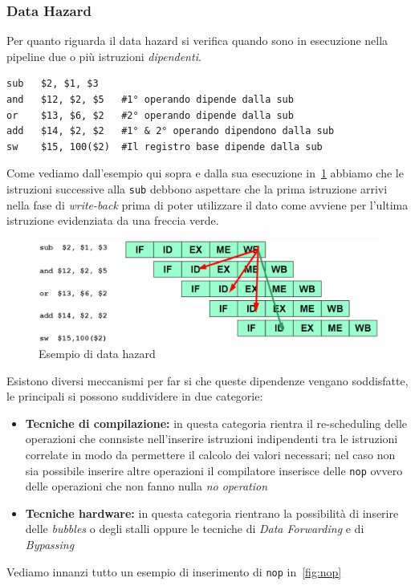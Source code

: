 \subsubsection{Data Hazard}
Per quanto riguarda il data hazard si verifica quando sono in esecuzione nella pipeline due o più istruzioni \emph{dipendenti}.
\begin{verbatim}
sub   $2, $1, $3
and   $12, $2, $5   #1° operando dipende dalla sub
or    $13, $6, $2   #2° operando dipende dalla sub
add   $14, $2, $2   #1° & 2° operando dipendono dalla sub
sw    $15, 100($2)  #Il registro base dipende dalla sub
\end{verbatim}
Come vediamo dall'esempio qui sopra e dalla sua esecuzione in \figurename\,\ref{fig:datahazard} abbiamo che le istruzioni successive alla \texttt{sub} debbono aspettare che la prima istruzione arrivi nella fase di \emph{write-back} prima di poter utilizzare il dato come avviene per l'ultima istruzione evidenziata da una freccia verde.
\begin{figure}[htb]
\centering
\includegraphics[scale=0.5]{img/datahazard.png}
\caption{Esempio di data hazard}\label{fig:datahazard}
\end{figure}
Esistono diversi meccanismi per far si che queste dipendenze vengano soddisfatte, le principali si possono suddividere in due categorie:
\begin{itemize}
\item \textbf{Tecniche di compilazione:} in questa categoria rientra il re-scheduling delle operazioni che connsiste nell'inserire istruzioni indipendenti tra le istruzioni correlate in modo da permettere il calcolo dei valori necessari; nel caso non sia possibile inserire altre operazioni il compilatore inserisce delle \texttt{nop} ovvero delle operazioni che non fanno nulla \emph{no operation}
\item \textbf{Tecniche hardware:} in questa categoria rientrano la possibilità di inserire delle \emph{bubbles} o degli stalli oppure le tecniche di \emph{Data Forwarding} e di \emph{Bypassing}
\end{itemize}
Vediamo innanzi tutto un esempio di inserimento di \texttt{nop} in \figurename\,\ref{fig:nop}
